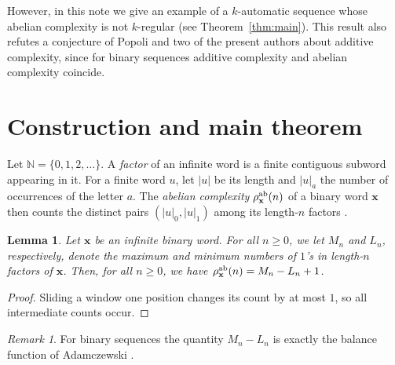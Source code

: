 \documentclass[12pt]{article}
\theoremstyle{plain}
\newtheorem{lemma}[theorem]{Lemma}
\theoremstyle{definition}
\theoremstyle{remark}
\newtheorem{remark}[theorem]{Remark}
\newcommand{\N}{\mathbb{N}}
\numberwithin{equation}{section}
\begin{document}
However, in this note we give an example of a $k$-automatic sequence whose abelian complexity is not $k$-regular (see Theorem~\ref{thm:main}).  This result also refutes a conjecture of Popoli and two of the present authors \cite[Conj.~4]{Popoli&Shallit&Stipulanti:2024} about additive complexity, since for binary sequences additive complexity and abelian complexity coincide.


\section{Construction and main theorem}

Let $\N=\{0,1,2,\ldots\}$. A \emph{factor} of an infinite
word is a finite contiguous subword appearing in it. For a finite word $u$,
let $\lvert u \rvert$ be its length and $\lvert u\rvert_a$ the number of occurrences of the letter $a$.
The \emph{abelian complexity} $\rho_{\mathbf{x}}^{\rm ab}(n)$ of a
binary word $\mathbf{x}$ then counts the distinct pairs
$(\lvert u\rvert_0, \lvert u\rvert_1)$ among its length-$n$ factors \cite{Richomme&Saari&Zamboni:2011}.

\begin{lemma}
\label{lem:computing-abcompl}
Let $\mathbf{x}$ be an infinite binary word.
For all $n\ge 0$, we let $M_n$ and $L_n$, respectively, denote the maximum and minimum numbers of $1$'s in length-$n$ factors of $\mathbf{x}$.
Then, for all $n\ge 0$, we have $\rho_{\mathbf{x}}^{\rm ab}(n)=M_n-L_n+1$.
\end{lemma}
\begin{proof}
Sliding a window one position changes its count by at most $1$, so all intermediate counts occur. 
\end{proof}

\begin{remark} For binary sequences the
quantity $M_n - L_n$ is exactly the balance function of
Adamczewski \cite{Adamczewski:2003}.
\end{remark}
\end{document}

